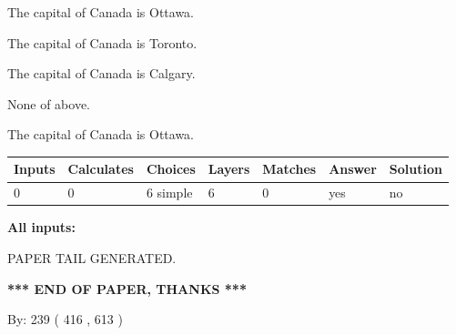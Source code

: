 \documentclass[12pt]{article}
\begin{document}
 
The capital of Canada is Ottawa.
 
 
The capital of Canada is Toronto.
 
 
The capital of Canada is Calgary.
 
 
 None of above.
 
 
\noindent{}
 
 
The capital of Canada is Ottawa.
 
 
\noindent{}
 
 
   
   
   
   
\noindent\begin{tabular}{|l|l|l|l|l|l|l|}
 \hline
Inputs & Calculates & Choices & Layers & Matches & Answer & Solution \\ \hline
 0  & 
 0  & 
 6
  simple  
  & 
 6  & 
 0  & 
  yes & 
  no 
  \\ \hline
 \end{tabular}
   
   
   
   
\noindent{}
   
   
   
   
\noindent\vspace{0.1in}\hspace{-0.08in} {\textbf{\Large{All inputs: }}}
   
   
   
   
   
   
 \vspace{0.2in}
 
   
   
\vspace{2.0in} PAPER TAIL GENERATED.
   
   
   
   
\vspace{1.0in} 
{\textbf{\large{ *** END OF PAPER, THANKS *** }}} 
   
   
\hspace{1.0in} By: 
 239 ( 416 ,  613 )
   
   
   
   
\newpage 
\setcounter{page}{ 
   584001 } 
   
\end{document}
